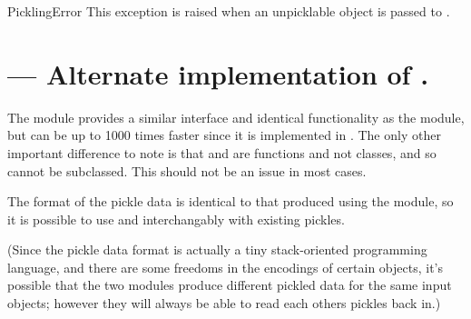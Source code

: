 \begin{excdesc}{PicklingError}
This exception is raised when an unpicklable object is passed to
.
\end{excdesc}


\begin{seealso}



\end{seealso}


\section{ ---
         Alternate implementation of .}




The  module provides a similar interface and identical
functionality as the  module, but can be up to 1000
times faster since it is implemented in \C{}.  The only other
important difference to note is that  and
 are functions and not classes, and so cannot be
subclassed.  This should not be an issue in most cases.

The format of the pickle data is identical to that produced using the
 module, so it is possible to use  and
 interchangably with existing pickles.

(Since the pickle data format is actually a tiny stack-oriented
programming language, and there are some freedoms in the encodings of
certain objects, it's possible that the two modules produce different
pickled data for the same input objects; however they will always be
able to read each others pickles back in.)
